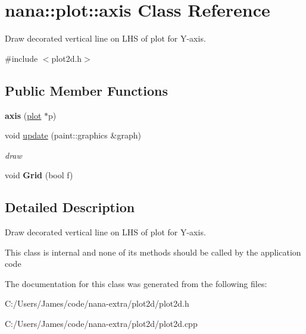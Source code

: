 \hypertarget{classnana_1_1plot_1_1axis}{\section{nana\-:\-:plot\-:\-:axis Class Reference}
\label{classnana_1_1plot_1_1axis}
}


Draw decorated vertical line on L\-H\-S of plot for Y-\/axis.  




{\ttfamily \#include $<$plot2d.\-h$>$}

\subsection*{Public Member Functions}
\begin{DoxyCompactItemize}
\item 
\hypertarget{classnana_1_1plot_1_1axis_afa2029cdac46218e270001ee9ab602fa}{{\bfseries axis} (\hyperlink{classnana_1_1plot_1_1plot}{plot} $\ast$p)}\label{classnana_1_1plot_1_1axis_afa2029cdac46218e270001ee9ab602fa}

\item 
\hypertarget{classnana_1_1plot_1_1axis_ad6625c3dba77c1390547a10b6457ad68}{void \hyperlink{classnana_1_1plot_1_1axis_ad6625c3dba77c1390547a10b6457ad68}{update} (paint\-::graphics \&graph)}\label{classnana_1_1plot_1_1axis_ad6625c3dba77c1390547a10b6457ad68}

\begin{DoxyCompactList}\small\item\em draw \end{DoxyCompactList}\item 
\hypertarget{classnana_1_1plot_1_1axis_a3815b00c2576401d5f86e6ae85f1b90b}{void {\bfseries Grid} (bool f)}\label{classnana_1_1plot_1_1axis_a3815b00c2576401d5f86e6ae85f1b90b}

\end{DoxyCompactItemize}


\subsection{Detailed Description}
Draw decorated vertical line on L\-H\-S of plot for Y-\/axis. 

This class is internal and none of its methods should be called by the application code 

The documentation for this class was generated from the following files\-:\begin{DoxyCompactItemize}
\item 
C\-:/\-Users/\-James/code/nana-\/extra/plot2d/plot2d.\-h\item 
C\-:/\-Users/\-James/code/nana-\/extra/plot2d/plot2d.\-cpp\end{DoxyCompactItemize}
